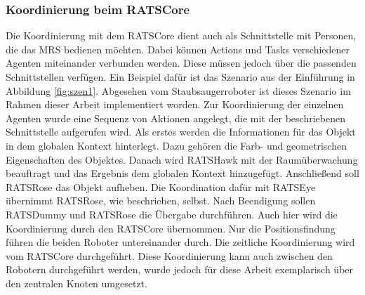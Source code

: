 \subsubsection{Koordinierung beim RATSCore}
Die Koordinierung mit dem RATSCore dient auch als Schnittstelle mit Personen, die das MRS bedienen möchten. Dabei können Actions und Tasks verschiedener Agenten miteinander verbunden werden. Diese müssen jedoch über die passenden Schnittstellen verfügen. Ein Beispiel dafür ist das Szenario aus der Einführung in Abbildung \ref{fig:szen1}. Abgesehen vom Staubsaugerroboter ist dieses Szenario im Rahmen dieser Arbeit implementiert worden. Zur Koordinierung der einzelnen Agenten wurde eine Sequenz von Aktionen angelegt, die mit der beschriebenen Schnittstelle aufgerufen wird. Als erstes werden die Informationen für das Objekt in dem globalen Kontext hinterlegt. Dazu gehören die Farb- und geometrischen Eigenschaften des Objektes. Danach wird RATSHawk mit der Raumüberwachung beauftragt und das Ergebnis dem globalen Kontext hinzugefügt. Anschließend soll RATSRose das Objekt aufheben. Die Koordination dafür mit RATSEye übernimmt RATSRose, wie beschrieben, selbst. Nach Beendigung sollen RATSDummy und RATSRose die Übergabe durchführen. Auch hier wird die Koordinierung durch den RATSCore übernommen. Nur die Positionsfindung führen die beiden Roboter untereinander durch. Die zeitliche Koordinierung wird vom RATSCore durchgeführt. Diese Koordinierung kann auch zwischen den Robotern durchgeführt werden, wurde jedoch für diese Arbeit exemplarisch über den zentralen Knoten umgesetzt.

